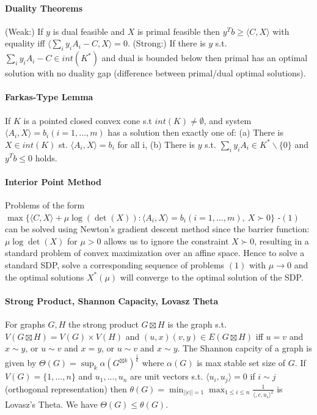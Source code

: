 \documentclass[letterpaper,11pt,oneside,onecolumn]{article}
\begin{document}
\paragraph{Duality Theorems} (Weak:) If $y$ is dual feasible and $X$ is primal feasible then $y^Tb \geq \langle C, X\rangle$ with equality iff $\langle \sum_i y_i A_i - C, X\rangle = 0$. (Strong:) If there is $y$ s.t. $\sum_i y_i A_i - C \in int(K^*)$ and dual is bounded below then primal has an optimal solution with no duality gap (difference between primal/dual optimal solutions).
\paragraph{Farkas-Type Lemma} If $K$ is a pointed closed convex cone s.t $int(K) \neq \emptyset$, and system $\langle A_i, X \rangle = b_i (i=1,\dots,m)$ has a solution then exactly one of: (a) There is $X \in int (K)$ st. $\langle A_i, X\rangle = b_i$ for all i, (b) There is $y$ s.t. $\sum_i y_i A_i \in K^*\backslash \{0\}$ and $y^Tb \leq 0$ holds.
\paragraph{Interior Point Method} Problems of the form $\max\{\langle C, X\rangle + \mu \log(\det(X)) : \langle A_i, X\rangle = b_i (i=1,\dots,m),\ X\succ 0 \}$ -$(1)$ can be solved using Newton's gradient descent method since the barrier function: $\mu \log\det(X)$ for $\mu > 0$ allows us to ignore the constraint $X \succ 0$, resulting in a standard problem of convex maximization over an affine space. Hence to solve a standard SDP, solve a corresponding sequence of problems $(1)$ with $\mu \rightarrow 0$ and the optimal solutions $X^*(\mu)$ will converge to the optimal solution of the SDP.
\paragraph{Strong Product, Shannon Capacity, Lovasz Theta} For graphs $G, H$ the strong product $G \boxtimes H$ is the graph s.t. $V(G\boxtimes H) = V(G) \times V(H)$ and $(u,x)(v,y) \in E(G\boxtimes H)$ iff $u=v$ and $x \sim y$, or $u\sim v$ and $x=y$, or $u\sim v$ and $x\sim y$. The Shannon capcity of a graph is given by $\Theta(G) = \sup_k \alpha(G^{\boxtimes k})^\frac{1}{k}$ where $\alpha(G)$ is max stable set size of $G$. If $V(G) = \{1,\dots, n\}$ and $u_1, \dots, u_n$ are unit vectors s.t. $\langle u_i, u_j\rangle = 0$ if $i \sim j$ (orthogonal representation) then $\theta(G) = \min_{||c|| = 1} \max_{1\leq i \leq n} \frac{1}{\langle, c,u_i\rangle^2}$ is Lovasz's Theta. We have $\Theta(G) \leq \theta (G)$.
\end{document}
